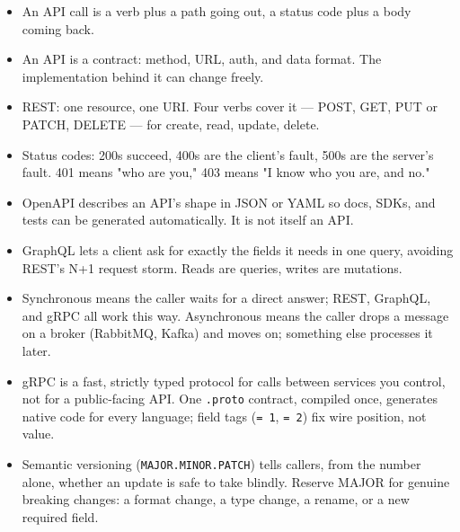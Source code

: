 \documentclass[a4paper,11pt]{article}
\begin{document}
\begin{keytake}
\begin{itemize}
  \item An API call is a verb plus a path going out, a status code plus a
        body coming back.
  \item An API is a contract: method, URL, auth, and data format. The
        implementation behind it can change freely.
  \item REST: one resource, one URI. Four verbs cover it ---
        POST, GET, PUT or PATCH, DELETE ---
        for create, read, update, delete.
  \item Status codes: 200s succeed, 400s are the client's fault, 500s are
        the server's fault. 401 means "who are you," 403 means "I know who
        you are, and no."
  \item OpenAPI describes an API's shape in JSON or YAML so docs, SDKs, and
        tests can be generated automatically. It is not itself an API.
  \item GraphQL lets a client ask for exactly the fields it needs in one
        query, avoiding REST's N+1 request storm. Reads are queries,
        writes are mutations.
  \item Synchronous means the caller waits for a direct answer; REST,
        GraphQL, and gRPC all work this way. Asynchronous means the
        caller drops a message on a broker (RabbitMQ, Kafka) and moves
        on; something else processes it later.
  \item gRPC is a fast, strictly typed protocol for calls between services
        you control, not for a public-facing API. One \texttt{.proto}
        contract, compiled once, generates native code for every
        language; field tags (\texttt{= 1}, \texttt{= 2}) fix wire
        position, not value.
  \item Semantic versioning (\texttt{MAJOR.MINOR.PATCH}) tells callers,
        from the number alone, whether an update is safe to take blindly.
        Reserve MAJOR for genuine breaking changes: a format change, a
        type change, a rename, or a new required field.
\end{itemize}
\end{keytake}

\end{document}
